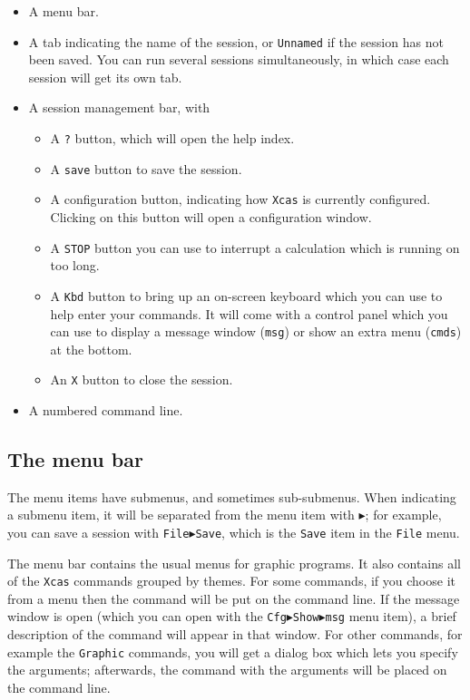 \documentclass{article}
\begin{document}
\begin{itemize}
  \item
  A menu bar.
  \item
  A tab indicating the name of the session, or \texttt{Unnamed} if the
  session has not been saved.  You can run several sessions
  simultaneously, in which case each session will get its own tab.
  \item
  A session management bar, with
  \begin{itemize}
    \item
    A \texttt{?} button, which will open the help index.
    \item
    A \texttt{save} button to save the session.
    \item
    A configuration button, indicating how \texttt{Xcas} is currently
    configured.  Clicking on this button will open a configuration
    window.
    \item
    A \texttt{STOP} button you can use to interrupt a calculation
    which is running on too long.
    \item
    A \texttt{Kbd} button to bring up an on-screen keyboard which you
    can use to help enter your commands.  It will come with a control panel
    which you can use to display a message window (\texttt{msg}) or
    show an extra menu (\texttt{cmds}) at the bottom.
    \item
    An \texttt{X} button to close the session.
  \end{itemize}
  \item
  A numbered command line.
\end{itemize}

\subsection{The menu bar}

The menu items have submenus, and sometimes sub-submenus. When
indicating a submenu item, it will be separated from the menu item with
$\blacktriangleright$; for example, you can save a session with
\texttt{File$\blacktriangleright$Save}, which is the \texttt{Save}
item in the \texttt{File} menu.

The menu bar contains the usual menus for graphic programs.  It also
contains all of the \texttt{Xcas} commands grouped by themes.  For
some commands, if you choose it from a menu then the command will be
put on the command line.  If the message window is open (which you can
open with the
\texttt{Cfg$\blacktriangleright$Show$\blacktriangleright$msg}
menu item), a brief description of the command will appear in that
window.  For other commands, for example the \texttt{Graphic}
commands, you will get a dialog box which lets you specify the
arguments; afterwards, the command with the arguments will be placed
on the command line.
\end{document}
